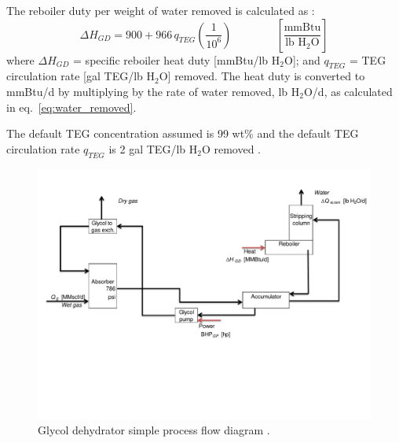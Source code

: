 \documentclass[11pt]{report}
\newcommand{\eqnunitfrac}[2]{\quad\quad \scriptstyle{\left[\frac{\text{#1}}{\text{#2}}\right]}}
\begin{document}
The reboiler duty per weight of water removed is calculated as \cite[p. 158]{Manning1991}: 
\begin{equation} \label{eq:gas_dehyd_heat}
\Delta H_{GD}= 900+966\,q_{TEG} \left( \frac{1}{10^6} \right) \quad\quad\eqnunitfrac{mmBtu}{lb H$_{2}$O}
\end{equation}
where $\Delta H_{GD}$ = specific reboiler heat duty [mmBtu/lb H$_{2}$O]; and $q_{TEG}$ = TEG circulation rate [gal TEG/lb H$_{2}$O] removed. The heat duty is converted to mmBtu/d by multiplying by the rate of water removed, lb H$_{2}$O/d, as calculated in eq.\ \eqref{eq:water_removed}.

The default TEG concentration assumed is 99 wt\% \cite[p. 155]{Manning1991} and the default TEG circulation rate $q_{TEG}$ is 2 gal TEG/lb H$_{2}$O removed \cite[p. 147]{Manning1991}.

\begin{landscape}
\begin{figure}[t]
\includegraphics[width=0.85\columnwidth]{images/glycol_dehydrator_process.pdf}
\caption{Glycol dehydrator simple process flow diagram \cite[p. 141]{Manning1991}.}
\label{fig:glycol_dehydrator_process}
\end{figure}
\end{landscape}
\end{document}
